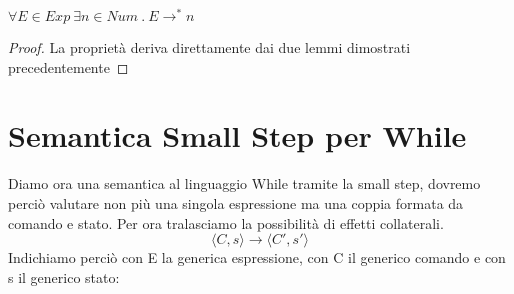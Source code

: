\begin{teorema}[Normalizzazione]
  $\forall E \in Exp\ \exists n \in Num\ .\ E \rightarrow ^* n$
\end{teorema}

\begin{proof}
  La proprietà deriva direttamente dai due lemmi dimostrati precedentemente
\end{proof}

\section{Semantica Small Step per While} 
Diamo ora una semantica al linguaggio While tramite la small step, dovremo
perciò valutare non più una singola espressione ma una coppia formata da
comando e stato. Per ora tralasciamo la possibilità di effetti collaterali.
$$
\langle C,s \rangle \rightarrow \langle C',s' \rangle
$$
Indichiamo perciò con E la generica espressione, con C il generico comando 
e con s il generico stato:


